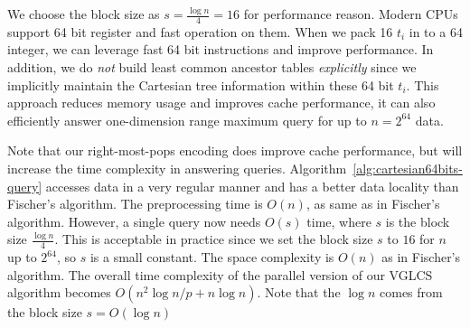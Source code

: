 

We choose the block size as $s = {{\frac{\log n}{4}}} = 16$ for
performance reason.  Modern CPUs support 64 bit register and fast
operation on them.  When we pack 16 $t_i$ in to a 64 integer, we can
leverage fast 64 bit instructions and improve performance.  In addition,
we do {\em not} build least common ancestor tables {\em explicitly}
since we implicitly maintain the Cartesian tree information within these
64 bit $t_i$.  This approach reduces memory usage and improves cache
performance, it can also efficiently answer one-dimension range maximum
query for up to $n = 2^{64}$ data.

Note that our right-most-pops encoding does improve cache performance,
but will increase the time complexity in answering queries.
Algorithm~\ref{alg:cartesian64bits-query} accesses data in a very
regular manner and has a better data locality than Fischer's algorithm.
The preprocessing time is $O(n)$, as same as in Fischer's algorithm.
However, a single query now needs $O(s)$ time, where $s$ is the block
size ${{\frac{\log n}{4}}}$.  This is acceptable in practice since we
set the block size $s$ to $16$ for $n$ up to $2^{64}$, so $s$ is a small
constant.  The space complexity is $O(n)$ as in Fischer's algorithm. The
overall time complexity of the parallel version of our VGLCS algorithm
becomes $O(n^2 \log{n} / p + n \log n)$.  Note that the $\log n$ comes
from the block size $s = O(\log n)$
